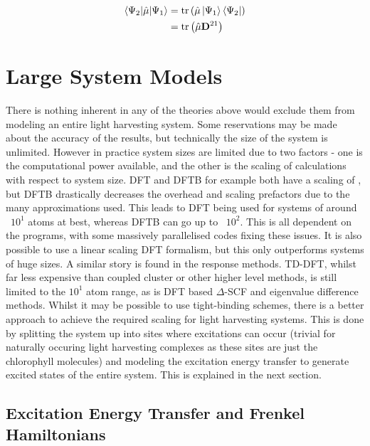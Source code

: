 \begin{equation}
\begin{split}    
\braket{\Psi_2|\hat{\mathbf{\mu}}|\Psi_1} &= \text{tr}\left(\hat{\mathbf{\mu}} \ket{\Psi_1} \bra{\Psi_2} \right) \\
&= \text{tr}\left( \hat{\mathbf{\mu}} \mathbf{D}^{21}\right)
\end{split}
\end{equation}
%
\section{Large System Models}
\label{sec:large_systems_theory}

There is nothing inherent in any of the theories above would exclude them from modeling
an entire light harvesting system. Some reservations may be made about the accuracy
of the results, but technically the size of the system is unlimited. However in 
practice system sizes are limited due to two factors - one is the computational 
power available, and the other is the scaling of calculations with respect to system
size. DFT and DFTB for example both have a scaling of , but DFTB drastically decreases
the overhead and scaling prefactors due to the many approximations used. This leads
to DFT being used for systems of around ~$10^1$ atoms at best, whereas DFTB can 
go up to ~$10^2$. This is all dependent on the programs, with some massively parallelised
codes fixing these issues. It is also possible to use a linear scaling DFT formalism,
but this only outperforms systems of huge sizes.
A similar story is found in the response methods. TD-DFT, whilst far less expensive
than coupled cluster or other higher level methods, is still limited to the $10^1$ 
atom range, as is DFT based $\Delta$-SCF and eigenvalue difference methods. Whilst
it may be possible to use tight-binding schemes, there is a better approach to achieve
the required scaling for light harvesting systems. This is done by splitting the
system up into sites where excitations can occur (trivial for naturally occuring 
light harvesting complexes as these sites are just the chlorophyll molecules) and
modeling the excitation energy transfer to generate excited states of the entire
system. This is explained in the next section.

\subsection{Excitation Energy Transfer and Frenkel Hamiltonians}
\label{subsec:frenkel_exciton_theory}

